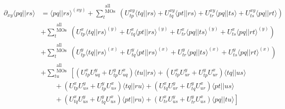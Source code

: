 \documentclass[12pt]{article}
\def\ket#1{| #1 \rangle}
\def\bra#1{\langle #1 |}
\def\aint#1#2{\bra{#1}\ket{#2}}
\newcommand{\allmos}{\substack{\textrm{all}{}\\\textrm{MOs}}}
\begin{document}
\begin{align}
\partial_{xy} \aint{pq}{rs} &= \aint{pq}{rs}^{(xy)}
+ \sum_t^{\allmos} \left( U_{tp}^{xy} \aint{tq}{rs} + U_{tq}^{xy} \aint{pt}{rs} + U_{tr}^{xy} \aint{pq}{ts} +
        U_{ts}^{xy} \aint{pq}{rt} \right)
\nonumber \\
& + \sum_t^{\allmos} \left(
U_{tp}^{x} \aint{tq}{rs}^{(y)} + U_{tq}^{x} \aint{pt}{rs}^{(y)} + U_{tr}^{x} \aint{pq}{ts}^{(y)} + U_{ts}^{x}
\aint{pq}{rt}^{(y)}
\right)
\nonumber \\
& + \sum_t^{\allmos} \left(
U_{tp}^{y} \aint{tq}{rs}^{(x)} + U_{tq}^{y} \aint{pt}{rs}^{(x)} + U_{tr}^{y} \aint{pq}{ts}^{(x)} + U_{ts}^{y}
\aint{pq}{rt}^{(x)}
\right)
\nonumber \\
& + \sum_{tu}^{\allmos} \left[
\left( U_{tp}^x U_{uq}^y + U_{tp}^y U_{uq}^x \right) \aint{tu}{rs}
+ \left( U_{tp}^x U_{ur}^y + U_{tp}^y U_{ur}^x \right) \aint{tq}{us}
\right.
\nonumber \\
& \qquad + \left( U_{tp}^x U_{us}^y + U_{tp}^y U_{us}^x \right) \aint{tq}{ru}
+ \left( U_{tq}^x U_{ur}^y + U_{tq}^y U_{ur}^x \right) \aint{pt}{us}
\nonumber \\
& \left.
\qquad + \left( U_{tq}^x U_{us}^y + U_{tq}^y U_{us}^x \right) \aint{pt}{ru}
+ \left( U_{tr}^x U_{us}^y + U_{tr}^y U_{us}^x \right) \aint{pq}{tu}
\right]
\end{align}
\end{document}
